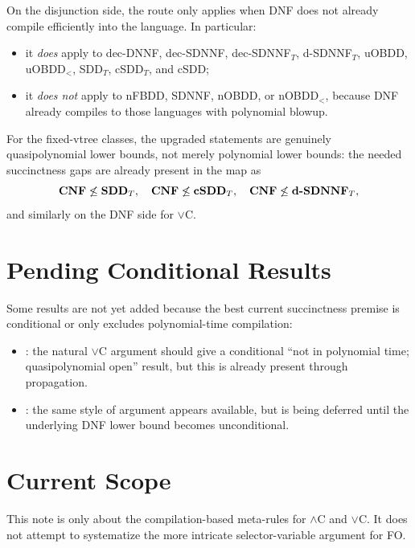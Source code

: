 \documentclass[11pt]{article}
\begin{document}
On the disjunction side, the route only applies when DNF does not already compile efficiently into the language.
In particular:
\begin{itemize}[noitemsep]
  \item it \emph{does} apply to dec-DNNF, dec-SDNNF, dec-SDNNF$_T$, d-SDNNF$_T$, uOBDD, uOBDD$_<$, SDD$_T$, cSDD$_T$, and cSDD;
  \item it \emph{does not} apply to nFBDD, SDNNF, nOBDD, or nOBDD$_<$, because DNF already compiles to those languages with polynomial blowup.
\end{itemize}

For the fixed-vtree classes, the upgraded statements are genuinely quasipolynomial lower bounds, not merely polynomial lower bounds: the needed succinctness gaps are already present in the map as
\[
\langref{CNF} \not\leq \langfam{SDD}{T},\quad
\langref{CNF} \not\leq \langfam{cSDD}{T},\quad
\langref{CNF} \not\leq \langfam{d\mbox{-}SDNNF}{T},
\]
and similarly on the DNF side for $\lor$C.

\section{Pending Conditional Results}
Some results are not yet added because the best current succinctness premise is conditional or only excludes polynomial-time compilation:
\begin{itemize}[noitemsep]
  \item {}: the natural $\lor$C argument should give a conditional ``not in polynomial time; quasipolynomial open'' result, but this is already present through propagation.
  \item {}: the same style of argument appears available, but is being deferred until the underlying DNF lower bound becomes unconditional.
\end{itemize}

\section{Current Scope}
This note is only about the compilation-based meta-rules for $\land$C and $\lor$C.
It does not attempt to systematize the more intricate selector-variable argument for FO.



\end{document}
